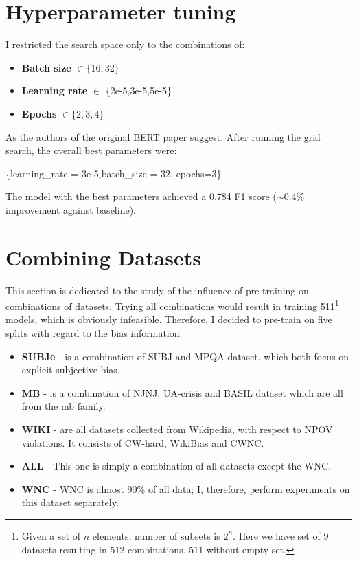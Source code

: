  
 
\newpage

 \section{Hyperparameter tuning}
I restricted the search space only to the combinations of:
 \begin{itemize}
     \item \textbf{Batch size} $\in \{16,32\}$
     \item \textbf{Learning rate} $\in $ \{2e-5,3e-5,5e-5\}
     \item \textbf{Epochs} $\in \{2,3,4\}$
 \end{itemize}
 
 As the authors of the original BERT paper suggest.  After running the grid search, the overall best parameters were:
 \begin{center}
      \{learning\_rate = 3e-5,batch\_size = 32, epochs=3\}
 \end{center}
 
 The model with the best parameters achieved a 0.784 F1 score ($\sim$0.4\% improvement against baseline).


 
 






\section{Combining Datasets}
This section is dedicated to the study of the influence of pre-training on combinations of datasets. Trying all combinations would result in training 511\footnote{Given a set of $n$ elements, number of subsets is $2^n$. Here we have set of 9 datasets resulting in 512 combinations. 511 without empty set.} models, which is obviously infeasible. Therefore, I decided to pre-train on five splits with regard to the bias information:
\begin{itemize}
    \item \textbf{SUBJe} - is a combination of SUBJ and MPQA dataset, which both focus on explicit subjective bias.
    \item \textbf{MB} - is a combination of NJNJ, UA-crisis and BASIL dataset which are all from the \gls{mb} family.
    \item \textbf{WIKI} - are all datasets collected from Wikipedia, with respect to NPOV violations. It consists of CW-hard, WikiBias and CWNC.
    \item \textbf{ALL} - This one is simply a combination of all datasets except the WNC.
    \item \textbf{WNC} - WNC is almost 90\% of all data; I, therefore, perform experiments on this dataset separately.
\end{itemize}
 

